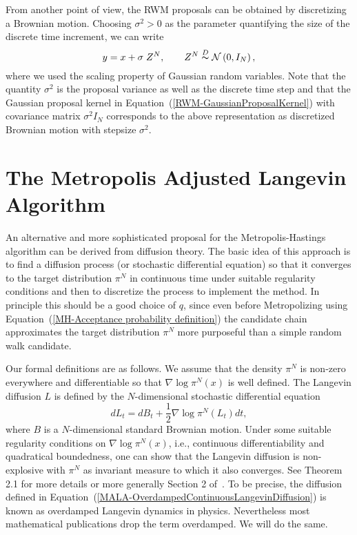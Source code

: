 \begin{rem}
 From another point of view, the RWM proposals can be obtained by discretizing a Brownian motion. Choosing $ \sigma^2 > 0 $ as the parameter quantifying the size of the
discrete time increment, we can write
\begin{equation}
 y = x + \sigma \; Z^N, \qquad Z^N \stackrel{D}{\thicksim} \mathcal{N}\left( 0, I_N \right),
\end{equation}
where we used the scaling property of Gaussian random variables. Note that the quantity $ \sigma^2 $ is the proposal variance as well as the discrete time step and that the Gaussian proposal kernel in Equation~(\ref{RWM-GaussianProposalKernel}) with covariance matrix $ \sigma^2 I_N $ corresponds to the above representation as discretized Brownian motion with stepsize $ \sigma^2 $.
\end{rem}





 

\section{The Metropolis Adjusted Langevin Algorithm}
\label{MH-MALA}

An alternative and more sophisticated proposal for the Metropolis-Hastings algorithm can be derived from diffusion theory. The basic idea of this approach is to find a diffusion process (or stochastic differential equation) so that it converges to the target distribution $ \pi^{N} $ in continuous time under suitable regularity conditions and then to discretize the process to implement the method. In principle this should be a good choice of $q$, since even before Metropolizing using Equation~(\ref{MH-Acceptance probability definition}) the candidate chain approximates the target distribution $ \pi^{N} $ more purposeful than a simple random walk candidate.

Our formal definitions are as follows. We assume that the density $ \pi ^{N} $ is non-zero everywhere and differentiable so that $ \nabla \log \pi^{N}(x) $ is well defined. The  Langevin diffusion $L$  is defined by the $N$-dimensional stochastic differential equation
\begin{equation}
 \label{MALA-OverdampedContinuousLangevinDiffusion}
 dL_t = dB_t + \frac{1}{2} \nabla \log \pi^{N}(L_t)dt,
\end{equation}
where $B$ is a $N$-dimensional standard Brownian motion. Under some suitable regularity conditions on $ \nabla \log \pi^{N}(x) $, i.e., continuous differentiability and quadratical boundedness, one can show that the Langevin diffusion is non-explosive with $ \pi^{N} $ as invariant measure to which it also converges. See Theorem 2.1  for more details or more generally Section 2 of~\autocite{TweedieRoberts1996}. To be precise, the diffusion defined in Equation~(\ref{MALA-OverdampedContinuousLangevinDiffusion}) is known as overdamped Langevin dynamics in physics. Nevertheless most mathematical publications drop the term overdamped. We will do the same.


